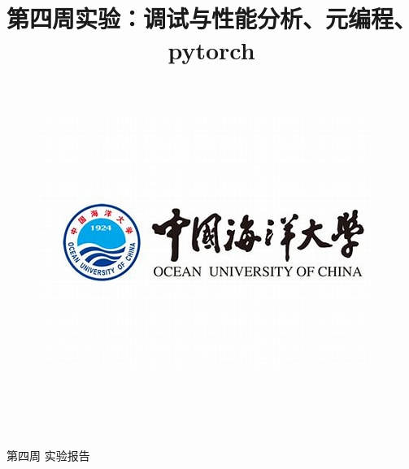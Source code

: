\documentclass[UTF8]{ctexart}
\title{{\heiti  第四周实验：调试与性能分析、元编程、pytorch }\vspace{-2em}}
\date{}
\begin{document}
\thispagestyle{empty}  %
\begin{figure}[tph!] %
	\centering
	\includegraphics[width=0.7\linewidth]{figure/2}
	
\end{figure}

\begin{center}%
	\quad \\ %
	\quad \\
	\quad \\
	\quad \\
	\heiti \fontsize{30}{17} \quad \quad 第\quad 四\quad 周\quad \quad \quad 
	\vskip 0.5cm
	\songti {} 实\quad 验\quad 报\quad 告%
\end{center}
\vskip 1cm
\end{document}
